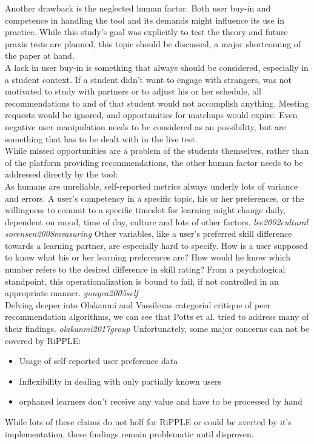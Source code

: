 \documentclass[nochapterpage,bigchapter,linedtoc,longdoc,colorback,accentcolor=tud3b,oneside]{tudreport}
\begin{document}
Another drawback is the neglected human factor. Both user buy-in and competence in handling the tool and its demands might influence its use in practice. While this study's goal was explicitly to test the theory and future praxis tests are planned, this topic should be discussed, a major shortcoming of the paper at hand.\\
A lack in user buy-in is something that always should be considered, especially in a student context. If a student didn't want to engage with strangers, was not motivated to study with partners or to adjust his or her schedule, all recommendations to and of that student would not accomplish anything. Meeting requests would be ignored, and opportunities for matchups would expire. Even negative user manipulation needs to be considered as an possibility, but are something that has to be dealt with in the live test.\\
While missed opportunities are a problem of the students themselves, rather than of the platform providing recommendations, the other human factor needs to be addressed directly by the tool:\\
As humans are unreliable, self-reported metrics always underly lots of variance and errors. A user's competency in a specific topic, his or her preferences, or the willingness to commit to a specific timeslot for learning might change daily, dependent on mood, time of day, culture and lots of other factors. \textit{lee2002cultural} \textit{sorensen2008measuring} Other variables, like a user's preferred skill difference towards a learning partner, are especially hard to specify. How is a user supposed to know what his or her learning preferences are? How would he know which number refers to the desired difference in skill rating? From a psychological standpoint, this operationalization is bound to fail, if not controlled in an appropriate manner. \textit{gonyea2005self}\\
Delving deeper into Olakanmi and Vassilevas categorial critique of peer recommendation algorithms, we can see that Potts et al. tried to address many of their findings. \textit{olakanmi2017group} Unfortunately, some major concerns can not be covered by RiPPLE:
\begin{itemize}
	\item Usage of self-reported user preference data
	\item Inflexibility in dealing with only partially known users
	\item orphaned learners don't receive any value and have to be processed by hand
\end{itemize}
While lots of these claims do not holf for RiPPLE or could be averted by it's implementation, these findings remain problematic until disproven. \\
\end{document}
